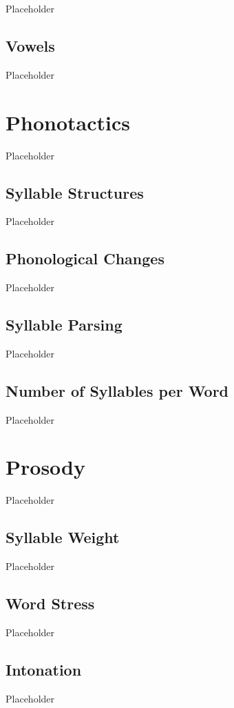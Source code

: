 Placeholder

\subsection{Vowels}
\label{subsec:rdk-vowels}

Placeholder

\section{\langrdk{} Phonotactics}
\label{sec:rdk-phonotactics}

Placeholder

\subsection{Syllable Structures}
\label{subsec:rdk-syll-struc}

Placeholder

\subsection{Phonological Changes}
\label{subsec:rdk-phone-changes}

Placeholder

\subsection{Syllable Parsing}
\label{subsec:rdk-syll-parse}

Placeholder

\subsection{Number of Syllables per Word}
\label{subsec:rdk-num-syll}

Placeholder

\section{\langrdk{} Prosody}
\label{sec:rdk-prosody}

Placeholder

\subsection{Syllable Weight}
\label{subsec:rdk-syll-weight}

Placeholder

\subsection{Word Stress}
\label{subsec:rdk-word-stress}

Placeholder

\subsection{Intonation}
\label{subsec:rdk-intonation}

Placeholder